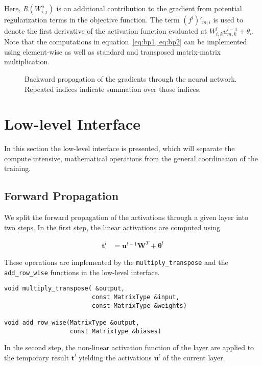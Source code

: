 \documentclass[a4paper,11pt,bibtotoc,xcolor=dvipsnames]{scrartcl}
\newcommand*{\code}[1]{\texttt{#1}}
\begin{document}
Here, $R(W^n_{i,j})$ is an additional contribution to the gradient from
potential regularization terms in the objective function. The term
$(f^l)'_{m,i}$ is used to denote the first derivative of the
activation function evaluated at $W^l_{i,k}u^{l-1}_{m,k} +
\theta_i$. Note that the computations in equation~\eqref{eq:bp1, eq:bp2} can be
implemented using element-wise as well as standard and transposed matrix-matrix
 multiplication.

\begin{figure}[!h]
\centering
\resizebox{\linewidth}{!}{%
}
\caption{Backward propagation of the gradients through the neural network.
  Repeated indices indicate summation over those indices.}
\label{fig:backward}
\end{figure}

\section{Low-level Interface}

In this section the low-level interface is presented, which will
separate the compute intensive, mathematical operations from the
general coordination of the training.

\subsection{Forward Propagation}

We split the forward propagation of the activations through a given layer into
two steps. In the first step, the linear activations are computed using

\begin{align}
  \mathbf{t}^l &= \mathbf{u}^{l-1} \mathbf{W}^T + \boldsymbol{\theta}^l
\end{align}

These operations are implemented by the \code{multiply_transpose} and the
\code{add_row_wise} functions in the low-level interface.

\begin{verbatim}
void multiply_transpose( &output,
                        const MatrixType &input,
                        const MatrixType &weights)

void add_row_wise(MatrixType &output,
                  const MatrixType &biases)

\end{verbatim}

In the second step, the non-linear activation function of the layer are applied
 to the temporary result $\mathbf{t}^l$ yielding the activations
 $\boldsymbol{u}^{l}$ of the current layer.
\end{document}
